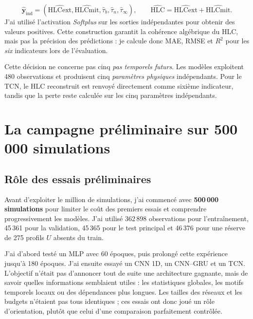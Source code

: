 \documentclass[10pt,a4paper]{article}
\newcommand{\hlc}{\mathrm{HLC}}
\newcommand{\hlcext}{\mathrm{HLCext}}
\newcommand{\hlcmit}{\mathrm{HLCmit}}
\begin{document}
\begin{equation}
 \hat{\boldsymbol y}_{\mathrm{ind}}=(\widehat{\hlcext},\widehat{\hlcmit},\hat\tau_b,\hat\tau_n,\hat\tau_\infty),
 \qquad
 \widehat{\hlc}=\widehat{\hlcext}+\widehat{\hlcmit}.
 \label{eq:physics}
\end{equation}
J'ai utilisé l'activation \emph{Softplus} sur les sorties indépendantes pour obtenir des valeurs positives. Cette construction garantit la cohérence algébrique du HLC, mais pas la précision des prédictions : je calcule donc MAE, RMSE et $R^2$ pour les \emph{six} indicateurs lors de l'évaluation.

Cette décision ne concerne pas cinq \emph{pas temporels futurs}. Les modèles exploitent 480 observations et produisent cinq \emph{paramètres physiques} indépendants. Pour le TCN, le HLC reconstruit est renvoyé directement comme sixième indicateur, tandis que la perte reste calculée sur les cinq paramètres indépendants.

\section{La campagne préliminaire sur 500\,000 simulations}

\subsection{Rôle des essais préliminaires}
Avant d'exploiter le million de simulations, j'ai commencé avec \textbf{500\,000 simulations} pour limiter le coût des premiers essais et comprendre progressivement les modèles. J'ai utilisé 362\,898 observations pour l'entraînement, 45\,361 pour la validation, 45\,365 pour le test principal et 46\,376 pour une réserve de 275 profils $U$ absents du train.

J'ai d'abord testé un MLP avec 60 époques, puis prolongé cette expérience jusqu'à 180 époques. J'ai ensuite essayé un CNN 1D, un CNN--GRU et un TCN. L'objectif n'était pas d'annoncer tout de suite une architecture gagnante, mais de savoir quelles informations semblaient utiles : les statistiques globales, les motifs temporels locaux ou des dépendances plus longues. Les tailles des réseaux et les budgets n'étaient pas tous identiques ; ces essais ont donc joué un rôle d'orientation, plutôt que celui d'une comparaison parfaitement contrôlée.
\end{document}

